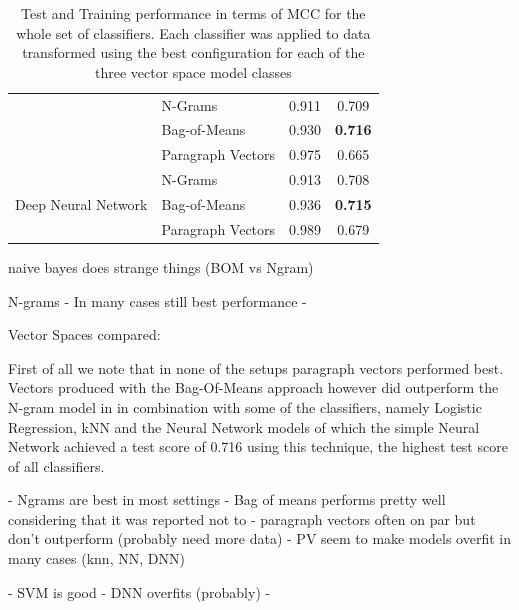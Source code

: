 \begin{table}[h]
\begin{center}
\begin{tabular}{ ll cc }
       & N-Grams & 0.911 & 0.709 \\
       & Bag-of-Means & 0.930 & \textbf{0.716} \\
       & Paragraph Vectors & 0.975 & 0.665 \\
      \midrule
      \multirow{3}{*}{Deep Neural Network}
       & N-Grams & 0.913 & 0.708 \\
       & Bag-of-Means & 0.936 & \textbf{0.715} \\
       & Paragraph Vectors & 0.989 & 0.679 \\
      \bottomrule
    \end{tabular}
  \caption{Test and Training performance in terms of \gls{MCC} for the whole set of classifiers. Each classifier was applied to data transformed using the best configuration for each of the three vector space model classes}
\label{tab:Classifier Results}
\end{center}
\end{table}



naive bayes does strange things (BOM vs Ngram)

N-grams
- In many cases still best performance
-



Vector Spaces compared:


First of all we note that in none of the setups paragraph vectors performed best. Vectors produced with the  Bag-Of-Means approach however did outperform the N-gram model in in combination with some of the classifiers, namely Logistic Regression, \gls{kNN} and the Neural Network models of which the simple Neural Network achieved a test score of 0.716 using this technique, the highest test score of all classifiers.

- Ngrams are best in most settings
- Bag of means performs pretty well considering that it was reported not to
- paragraph vectors often on par but don't outperform (probably need more data)
- PV seem to make models overfit in many cases (knn, NN, DNN)

- SVM is good
- DNN overfits (probably)
-


